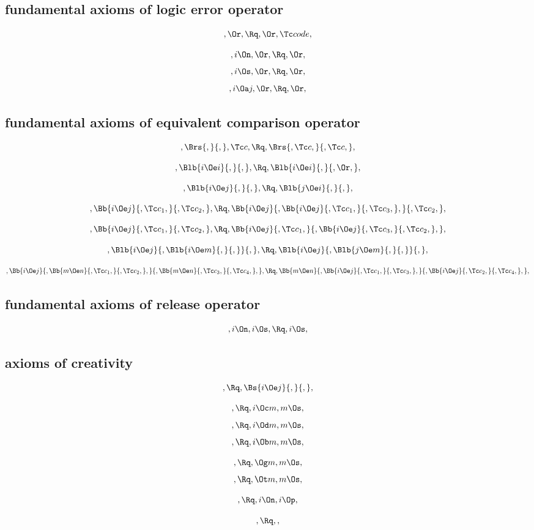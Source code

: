 \bigskip
\subsection{fundamental axioms of logic error operator}

\[,\Or, \Rq ,\Or, \Tc code,\]


\[,i \On, \Or, \Rq ,\Or,\]
\[,i \Os, \Or, \Rq ,\Or,\]
\[,i \Oa j, \Or, \Rq ,\Or,\]



\bigskip
\subsection{ fundamental axioms of equivalent comparison operator}

\[,\Brs{,}{,} ,\Tc c, \Rq, \Brs{,\Tc c,}{,\Tc c,},\]

\bigskip

\[, \Blb{i \Oe i}{,}{,}, \Rq , \Blb{i \Oe i}{,}{, \Or,},\]


\bigskip

\[, \Blb{i \Oe j}{,}{,}, \Rq , \Blb{j \Oe i}{,}{,},\]


\bigskip

\[, \Bb{i \Oe j}{,\Tc c_1,}{,\Tc c_2,}, \Rq , \Bb{i \Oe j}{, \Bb{i \Oe j}{,\Tc c_1,}{,\Tc c_3,},}{,\Tc c_2,} ,\]

\bigskip

\[, \Bb{i \Oe j}{,\Tc c_1,}{,\Tc c_2,}, \Rq , \Bb{i \Oe j}{, \Tc c_1,}{,\Bb{i \Oe j}{,\Tc c_3,}{,\Tc c_2,},} ,\]


\bigskip

\[, \Blb{i \Oe j}{,\Blb{i \Oe m}{,}{,}}{,}, \Rq , \Blb{i \Oe j}{, \Blb{j \Oe m}{,}{,}}{,}, \]


\bigskip
\[, \Bb{i \Oe j}{,\Bb{m \Oe n}{,\Tc c_1,}{,\Tc c_2,},}{, \Bb{m \Oe n}{,\Tc c_3,}{,\Tc c_4,},}, \Rq ,  \Bb{m \Oe n}{,\Bb{i \Oe j}{,\Tc c_1,}{,\Tc c_3,},}{, \Bb{i \Oe j}{,\Tc c_2,}{,\Tc c_4,},},\]


\bigskip
\subsection{fundamental axioms of release operator}

\[,i \On ,i \Os , \Rq ,i \Os,\]



\bigskip
\subsection{axioms of creativity}

\[, \Rq , \Bs{i \Oe j}{,}{,} ,\]

\[, \Rq ,i \Oc m ,m \Os,\]
\[, \Rq ,i \Od m ,m \Os,\]
\[, \Rq ,i \Ob m ,m \Os,\]

\[, \Rq ,\Og m ,m \Os,\]
\[, \Rq ,\Ot m ,m \Os,\]


\[, \Rq ,i \On ,i \Op,\]

\[, \Rq , ,\]
